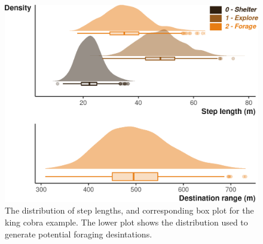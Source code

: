 \documentclass[10pt,a4paper]{article}
\newenvironment{Shaded}{}{}
\newcommand{\AttributeTok}[1]{#1}
\newcommand{\ConstantTok}[1]{#1}
\newcommand{\DecValTok}[1]{#1}
\newcommand{\FloatTok}[1]{#1}
\newcommand{\FunctionTok}[1]{#1}
\newcommand{\NormalTok}[1]{#1}
\newcommand{\OtherTok}[1]{#1}
\newcommand{\SpecialCharTok}[1]{#1}
\newcommand{\StringTok}[1]{#1}
\begin{document}
\begin{Shaded}
\end{Shaded}

\begin{figure}

{\centering \includegraphics{Agent-based_model_walkthrough_files/figure-latex/KINGCOBRAsettingMoveDesPlot-1} 

}

\caption{The distribution of step lengths, and corresponding box plot for the king cobra example. The lower plot shows the distribution used to generate potential foraging desintations.}\label{fig:KINGCOBRAsettingMoveDesPlot}
\end{figure}
\end{document}
